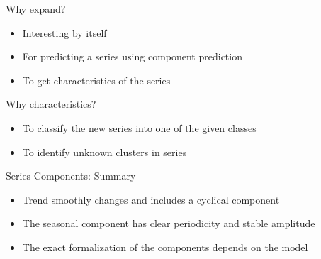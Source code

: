 \begin{frame}{Why expand?}
	
	\begin{itemize}[<+->]
		\item Interesting \alert{by itself}
		\item For \alert{predicting} a series using component prediction
		\item To get \alert{characteristics of the series}
	\end{itemize}
	
	\pause
	Why characteristics?
	
	\begin{itemize}[<+->]
		\item To classify the new series into one of the given classes
		\item To identify unknown clusters in series
	\end{itemize}
	
\end{frame}


\begin{frame}{Series Components: Summary}
	\begin{itemize}[<+->]
		\item Trend \alert{smoothly changes} and includes a cyclical component
		\item The seasonal component has \alert{clear periodicity} and \alert{stable amplitude}
		\item The exact formalization of the components \alert{depends on the model}
	\end{itemize}
	
\end{frame}